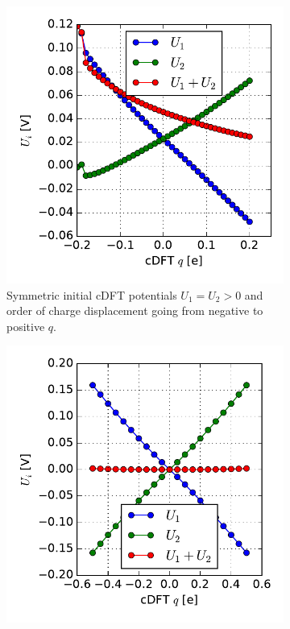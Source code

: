 \begin{figure}[!p]
	\centering
	\begin{subfigure}{0.45\textwidth}
	\centering
	\includegraphics[width = \textwidth]{Images/polyacetylene/charging/potential_q_asymmetric}
	\caption{Symmetric initial cDFT potentials \mbox{$U_1 = U_2 > 0$} and order of charge displacement going from negative to  positive $q$.}
	\label{}
	\end{subfigure}\hspace*{.5cm}
	\begin{subfigure}{0.45\textwidth}
	\centering
	\includegraphics[width = \textwidth]{Images/polyacetylene/charging/potential_q_1}

\end{subfigure}
\end{figure}
